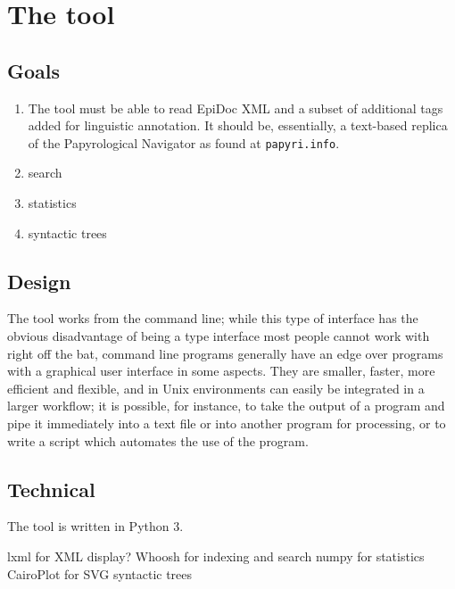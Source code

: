 \chapter{The tool}
\label{chp:design}
\minitoc\mtcskip
\section{Goals} %
\label{sec:tool-goals}


\begin{enumerate} 
  \item The tool must be able to read EpiDoc XML and a subset of
      additional tags added for linguistic annotation. It should be,
      essentially, a text-based replica of the Papyrological Navigator as found
      at \texttt{papyri.info}. 
    \item search 
    \item statistics
    \item syntactic trees
\end{enumerate}

\section{Design} %

The tool works from the command line; while this type of interface has the
obvious disadvantage of being a type interface most people cannot work with
right off the bat, command line programs generally have an edge over programs
with a graphical user interface in some aspects. They are smaller, faster, more
efficient and flexible, and in Unix environments can easily be integrated in a
larger workflow; it is possible, for instance, to take the output of a program
and pipe it immediately into a text file or into another program for
processing, or to write a script which automates the use of the program.


\section{Technical} %
\label{sec:tool-technical}
The tool is written in Python 3. 

lxml for XML display?
Whoosh for indexing and search
numpy for statistics
CairoPlot for SVG syntactic trees

